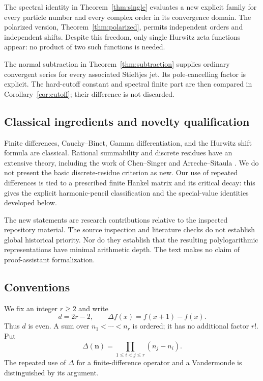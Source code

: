 \documentclass[11pt,letterpaper]{article}
\numberwithin{equation}{section}
\theoremstyle{definition}\newtheorem{definition}[theorem]{Definition}
\theoremstyle{remark}\newtheorem{remark}[theorem]{Remark}
\begin{document}
The spectral identity in Theorem~\ref{thm:single} evaluates a new explicit
family for every particle number and every complex order in its convergence
domain. The polarized version, Theorem~\ref{thm:polarized}, permits independent
orders and independent shifts. Despite this freedom, only single Hurwitz
zeta functions appear: no product of two such functions is needed.

The normal subtraction in Theorem~\ref{thm:subtraction} supplies ordinary
convergent series for every associated Stieltjes jet. Its pole-cancelling
factor is explicit. The hard-cutoff constant and spectral finite part are
then compared in Corollary~\ref{cor:cutoff}; their difference is not discarded.

\subsection{Classical ingredients and novelty qualification}
Finite differences, Cauchy--Binet, Gamma differentiation, and the Hurwitz
shift formula are classical. Rational summability and discrete residues
have an extensive theory, including the work of Chen--Singer and
Arreche--Sitaula \cite{chen-singer,arreche-sitaula}. We do not present the
basic discrete-residue criterion as new. Our use of repeated differences
is tied to a prescribed finite Hankel matrix and its critical decay:
this gives the explicit harmonic-pencil classification and the special-value
identities developed below.

The new statements are research contributions relative to the inspected
repository material. The source inspection and literature checks do not
establish global historical priority. Nor do they establish that the
resulting polylogarithmic representations have minimal arithmetic depth.
The text makes no claim of proof-assistant formalization.

\subsection{Conventions}
We fix an integer $r\ge2$ and write
\begin{equation}\label{eq:d}
 d=2r-2,\qquad \Delta f(x)=f(x+1)-f(x).
\end{equation}
Thus $d$ is even. A sum over $n_1<\cdots<n_r$ is ordered; it has no
additional factor $r!$. Put
\[
 \Delta(\bm n)=\prod_{1\le i<j\le r}(n_j-n_i).
\]
The repeated use of $\Delta$ for a finite-difference operator and a
Vandermonde is distinguished by its argument.
\end{document}
